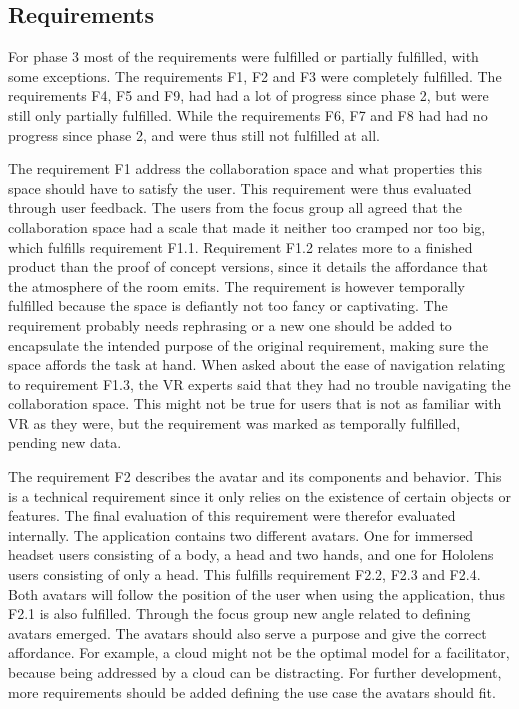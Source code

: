         \subsection{Requirements}
        For phase 3 most of the requirements were fulfilled or partially fulfilled, with some exceptions. The requirements F1, F2 and F3 were completely fulfilled. The requirements F4, F5 and F9, had had a lot of progress since phase 2, but were still only partially fulfilled. While the requirements F6, F7 and F8 had had no progress since phase 2, and were thus still not fulfilled at all.
        
        The requirement F1 address the collaboration space and what properties this space should have to satisfy the user. This requirement were thus evaluated through user feedback. The users from the focus group all agreed that the collaboration space had a scale that made it neither too cramped nor too big, which fulfills requirement F1.1. Requirement F1.2 relates more to a finished product than the proof of concept versions, since it details the affordance that the atmosphere of the room emits. The requirement is however temporally fulfilled because the space is defiantly not too fancy or captivating. The requirement probably needs rephrasing or a new one should be added to encapsulate the intended purpose of the original requirement, making sure the space affords the task at hand. When asked about the ease of navigation relating to requirement F1.3, the VR experts said that they had no trouble navigating the collaboration space. This might not be true for users that is not as familiar with VR as they were, but the requirement was marked as temporally fulfilled, pending new data.
        
        The requirement F2 describes the avatar and its components and behavior. This is a technical requirement since it only relies on the existence of certain objects or features. The final evaluation of this requirement were therefor evaluated internally. The application contains two different avatars. One for immersed headset users consisting of a body, a head and two hands, and one for Hololens users consisting of only a head. This fulfills requirement F2.2, F2.3 and F2.4. Both avatars will follow the position of the user when using the application, thus F2.1 is also fulfilled. Through the focus group new angle related to defining avatars emerged. The avatars should also serve a purpose and give the correct affordance. For example, a cloud might not be the optimal model for a facilitator, because being addressed by a cloud can be distracting. For further development, more requirements should be added defining the use case the avatars should fit.
        
